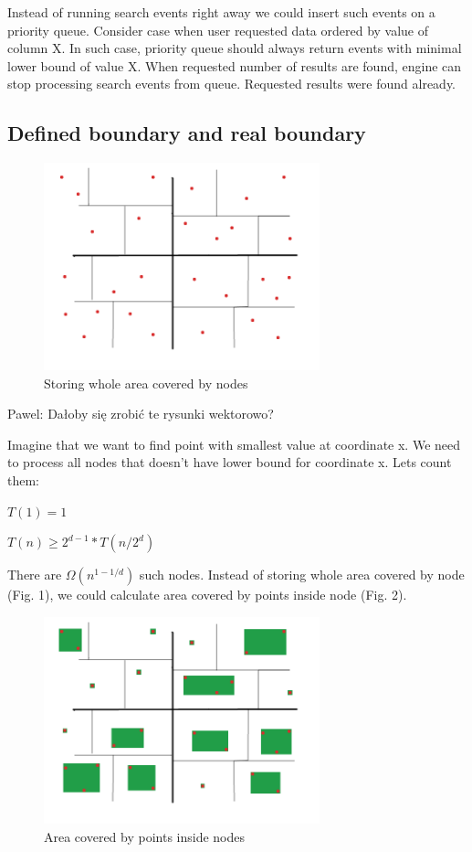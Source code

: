 \documentclass[10pt,a4paper]{article}
\newcommand{\pawel}[1]{\noindent\colorbox{myRed}{Pawel: #1}}
\begin{document}
Instead of running search events right away we could insert such events on a priority queue. Consider case when user requested data ordered by value of column X. In such case, priority queue should always return events with minimal lower bound of value X. When requested number of results are found, engine can stop processing search events from queue. Requested results were found already.

\subsection{Defined boundary and real boundary}

\begin{figure}
\centering
  \includegraphics[width=8cm]{simple_boundary.png}%
  \caption{Storing whole area covered by nodes}
\end{figure}
\pawel{Dałoby się zrobić te rysunki wektorowo?}

Imagine that we want to find point with smallest value at coordinate x. We need to process all nodes
that doesn't have lower bound for coordinate x. Lets count them:
\bigskip

$T(1) = 1$

$T(n) \geq 2^{d-1} * T(n/2^{d})$

\bigskip

There are $\Omega (n^{1-1/d})$ such nodes. Instead of storing whole area covered by node (Fig. 1), we could calculate area covered by points inside node (Fig. 2).

\begin{figure}
\centering
  \includegraphics[width=8cm]{simple_boundary2.png}%
  \caption{Area covered by points inside nodes}
\end{figure}
\end{document}

